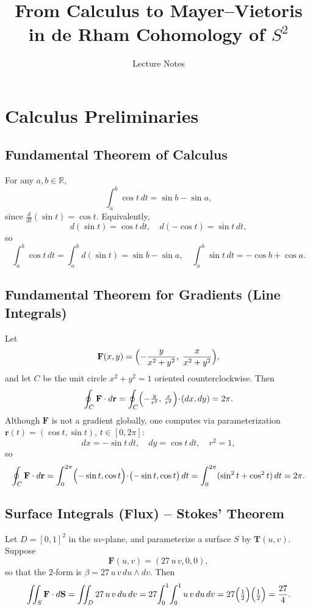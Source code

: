 \documentclass[12pt]{article}
\begin{document}
	
	\title{From Calculus to Mayer–Vietoris in de Rham Cohomology of \(S^2\)}
	\author{Lecture Notes}
	\date{}
	\maketitle
	
	\tableofcontents
	
	\section{Calculus Preliminaries}
	
	\subsection{Fundamental Theorem of Calculus}
	For any \(a,b\in\mathbb{R}\),
	\[
	\int_a^b \cos t\,dt = \sin b - \sin a,
	\]
	since \(\tfrac{d}{dt}(\sin t)=\cos t\).  Equivalently,
	\[
	d(\sin t)=\cos t\,dt,
	\quad
	d(-\cos t)=\sin t\,dt,
	\]
	so
	\[
	\int_a^b \cos t\,dt = \int_a^b d(\sin t) = \sin b - \sin a,
	\quad
	\int_a^b \sin t\,dt = -\cos b + \cos a.
	\]
	
	\subsection{Fundamental Theorem for Gradients (Line Integrals)}
	Let 
	\[
	\mathbf{F}(x,y)
	=\Bigl(-\frac{y}{x^2+y^2},\;\frac{x}{x^2+y^2}\Bigr),
	\]
	and let \(C\) be the unit circle \(x^2+y^2=1\) oriented counterclockwise.  Then
	\[
	\oint_C \mathbf{F}\cdot d\mathbf{r}
	= \oint_C \Bigl(-\tfrac{y}{r^2},\,\tfrac{x}{r^2}\Bigr)\!\cdot\!(dx,dy)
	= 2\pi.
	\]
	Although \(\mathbf{F}\) is not a gradient globally, one computes via parameterization 
	\(\mathbf{r}(t)=(\cos t,\sin t)\), \(t\in[0,2\pi]\):
	\[
	dx=-\sin t\,dt,\quad dy=\cos t\,dt,\quad r^2=1,
	\]
	so
	\[
	\oint_C\mathbf{F}\cdot d\mathbf{r}
	=\int_0^{2\pi}\Bigl(-\sin t,\cos t\Bigr)\!\cdot\!\bigl(-\sin t,\cos t\bigr)\,dt
	=\int_0^{2\pi}(\sin^2t+\cos^2t)\,dt
	=2\pi.
	\]
	
	\subsection{Surface Integrals (Flux) -- Stokes' Theorem}
	Let \(D=[0,1]^2\) in the \(uv\)-plane, and parameterize a surface \(S\) by
	\(\mathbf{T}(u,v)\).  Suppose
	\[
	\mathbf{F}(u,v)=(27\,u\,v,0,0),
	\]
	so that the \(2\)-form is
	\(\beta=27\,u\,v\,du\wedge dv\).  Then
	\[
	\iint_S \mathbf{F}\cdot d\mathbf{S}
	=\iint_D 27\,u\,v\,du\,dv
	=27\!\int_0^1\!\int_0^1 u\,v\,du\,dv
	=27\Bigl(\tfrac12\Bigr)\Bigl(\tfrac12\Bigr)
	=\frac{27}{4}.
	\]
	
\end{document}
